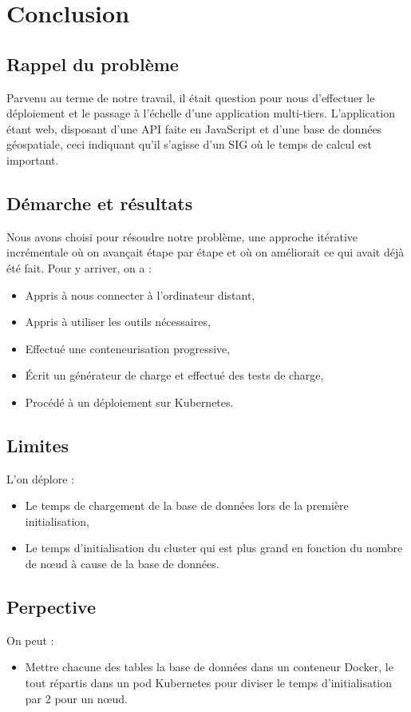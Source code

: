\chapter*{Conclusion}
\label{chap:conclusion}

\section*{Rappel du problème}
Parvenu au terme de notre travail, il était question pour nous d'effectuer le déploiement et le passage à l'échelle d'une application
multi-tiers. L'application étant web, disposant d'une API faite en JavaScript et d'une base de données géospatiale, ceci indiquant qu'il 
s'agisse d'un SIG où le temps de calcul est important.

\section*{Démarche et résultats}
Nous avons choisi pour résoudre notre problème, une approche itérative incrémentale où on avançait étape par étape et où on améliorait ce 
qui avait déjà été fait. Pour y arriver, on a :
\begin{itemize}
    \item Appris à nous connecter à l'ordinateur distant,
    \item Appris à utiliser les outils nécessaires,
    \item Effectué une conteneurisation progressive,
    \item \'Ecrit un générateur de charge et effectué des tests de charge,
    \item Procédé à un déploiement sur Kubernetes.
\end{itemize}

\section*{Limites}
L'on déplore :
\begin{itemize}
    \item Le temps de chargement de la base de données lors de la première initialisation,
    \item Le temps d'initialisation du cluster qui est plus grand en fonction du nombre de n\oe ud à cause de la base de données.
\end{itemize}

\section*{Perpective}
On peut :
\begin{itemize}
    \item Mettre chacune des tables la base de données dans un conteneur Docker, le tout répartis dans un pod Kubernetes pour diviser le temps d'initialisation par 2 pour un n\oe ud.
\end{itemize}